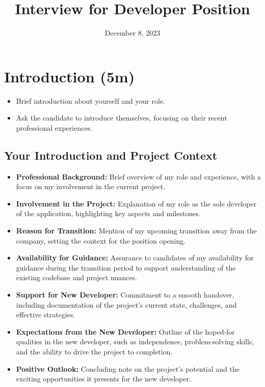\documentclass{article}
\title{Interview for Developer Position}\vspace{1.5in}
\author{}
\date{December 8, 2023}
\begin{document}
\maketitle

\tableofcontents

\hrulefill

\section{Introduction (5m)}

\begin{itemize}
    \item Brief introduction about yourself and your role.
    \item Ask the candidate to introduce themselves, focusing on their recent professional experiences.
\end{itemize}

\subsection*{Your Introduction and Project Context}
\begin{itemize}
    \item \textbf{Professional Background:} Brief overview of my role and experience, with a focus on my involvement in the current project.
    \item \textbf{Involvement in the Project:} Explanation of my role as the sole developer of the application, highlighting key aspects and milestones.
    \item \textbf{Reason for Transition:} Mention of my upcoming transition away from the company, setting the context for the position opening.
    \item \textbf{Availability for Guidance:} Assurance to candidates of my availability for guidance during the transition period to support understanding of the existing codebase and project nuances.
    \item \textbf{Support for New Developer:} Commitment to a smooth handover, including documentation of the project's current state, challenges, and effective strategies.
    \item \textbf{Expectations from the New Developer:} Outline of the hoped-for qualities in the new developer, such as independence, problem-solving skills, and the ability to drive the project to completion.
    \item \textbf{Positive Outlook:} Concluding note on the project's potential and the exciting opportunities it presents for the new developer.
\end{itemize}
\end{document}
